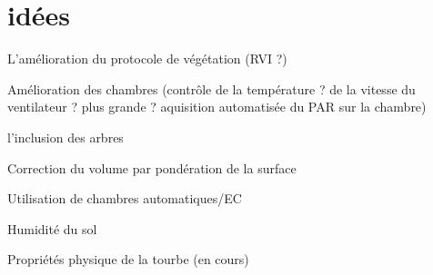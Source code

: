 \section{idées}

L'amélioration du protocole de végétation (RVI ?)

Amélioration des chambres (contrôle de la température ? de la vitesse du ventilateur ? plus grande ? aquisition automatisée du PAR sur la chambre)

l'inclusion des arbres

Correction du volume par pondération de la surface

Utilisation de chambres automatiques/EC

Humidité du sol

Propriétés physique de la tourbe (en cours)

